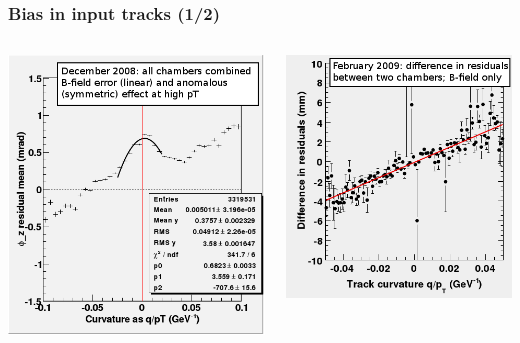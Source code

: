 \documentclass[compress]{beamer}
\begin{document}
\begin{frame}
\frametitle{Bias in input tracks (1/2)}

\begin{columns}
\includegraphics[width=\linewidth]{old_Deltax_vs_qoverpT.png}

\includegraphics[width=\linewidth]{old_Deltax1-Deltax2_vs_qoverpT.png}


\end{columns}
\end{frame}
\end{document}

